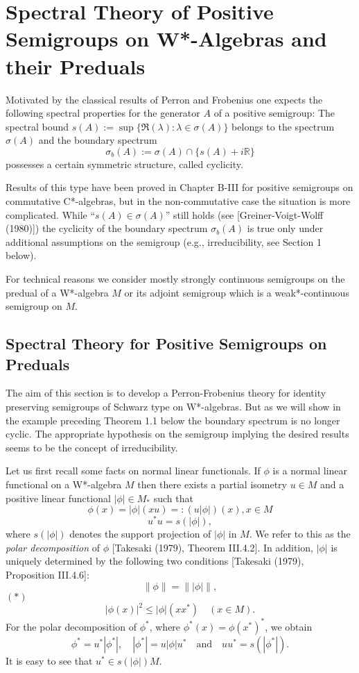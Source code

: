 
\chapter{Spectral Theory of Positive Semigroups on W*-Algebras and their Preduals}\label{chap:D-III}

Motivated by the classical results of Perron and Frobenius one expects the following spectral properties for the generator $A$ of a positive semigroup: The spectral bound $s(A) := \sup\{\Re(\lambda) : \lambda \in \sigma(A)\}$ belongs to the spectrum $\sigma(A)$ and the boundary spectrum
\[
\sigma_{b}(A) := \sigma(A) \cap \{s(A)+i\mathbb{R}\}
\]
possesses a certain symmetric structure, called cyclicity.

Results of this type have been proved in Chapter B-III for positive semigroups on commutative C*-algebras, but in the non-commutative case the situation is more complicated.
While \enquote{$s(A) \in \sigma(A)$} still holds (see [Greiner-Voigt-Wolff (1980)]) the cyclicity of the boundary spectrum $\sigma_{b}(A)$ is true only under additional assumptions on the semigroup (e.g., irreducibility, see Section 1 below).

For technical reasons we consider mostly strongly continuous semigroups on the predual of a W*-algebra $M$ or its adjoint semigroup which is a weak*-continuous semigroup on $M$.

\section{Spectral Theory for Positive Semigroups on Preduals}\label{sec:d3-1}

The aim of this section is to develop a Perron-Frobenius theory for identity preserving semigroups of Schwarz type on W*-algebras.
But as we will show in the example preceding Theorem 1.1 below the boundary spectrum is no longer cyclic.
The appropriate hypothesis on the semigroup implying the desired results seems to be the concept of irreducibility.


Let us first recall some facts on normal linear functionals.
If $\phi$ is a normal linear functional on a W*-algebra $M$ then there exists a partial isometry $u\in M$ and a positive linear functional $|\phi|\in M_{*}$ such that
\[
\phi(x) = |\phi|(xu) =: (u|\phi|)(x), x\in M
\]
\[
u^*u = s(|\phi|),
\]
where $s(|\phi|)$ denotes the support projection of $|\phi|$ in $M$.
We refer to this as the \emph{polar decomposition} of $\phi$ [Takesaki (1979), Theorem III.4.2].
In addition, $|\phi|$ is uniquely determined by the following two conditions [Takesaki (1979), Proposition III.4.6]:
\[
	\|\phi\| = \| |\phi| \|,
\]
$(*)$ 
\[
	|\phi(x)|^{2} \leq |\phi|(xx^*) \quad (x\in M).
\]
For the polar decomposition of $\phi^*$, where $\phi^*(x) = \phi(x^*)^*$, we obtain
\[
	\phi^* = u^*|\phi^*|, \quad |\phi^*| = u|\phi|u^* \quad \text{and} \quad 		uu^* = s(|\phi^*|).
\]
It is easy to see that $u^*\in s(|\phi|)M$.

